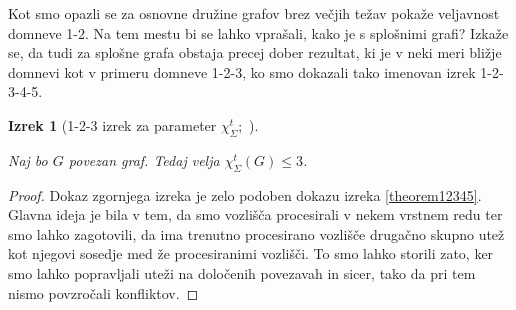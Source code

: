 \documentclass[12pt,a4paper,twoside]{article}
\theoremstyle{definition} %
\theoremstyle{plain} %
\newtheorem{izrek}[definicija]{Izrek}
\newcommand{\ect}{\chi_{\Sigma}^t}
\numberwithin{equation}{section}  %
\begin{document}
Kot smo opazli se za osnovne družine grafov brez večjih težav pokaže veljavnost domneve 1-2. Na tem mestu bi se lahko vprašali, kako je s splošnimi grafi? Izkaže se, da tudi za splošne grafa obstaja precej dober rezultat, ki je v neki meri bližje domnevi kot v primeru domneve 1-2-3, ko smo dokazali tako imenovan izrek 1-2-3-4-5.
\begin{izrek}[1-2-3 izrek za parameter $\ect$;~\citet{total123}]
\label{theorem123}

Naj bo $G$ povezan graf. Tedaj velja $\ect(G) \le 3$.
 \end{izrek}

\begin{proof}
Dokaz zgornjega izreka je zelo podoben dokazu izreka \ref{theorem12345}. Glavna ideja je bila v tem, da smo vozlišča procesirali v nekem vrstnem redu ter smo lahko zagotovili, da ima trenutno procesirano vozlišče drugačno skupno utež kot njegovi sosedje med že procesiranimi vozlišči. To smo lahko storili zato, ker smo lahko popravljali uteži na določenih povezavah in sicer, tako da pri tem nismo povzročali konfliktov.


\end{proof}
\end{document}
